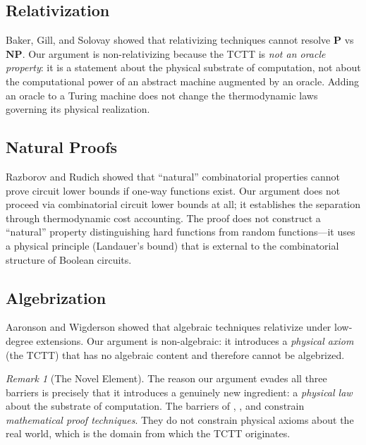 \documentclass[12pt, a4paper]{article}
\newcommand{\Pc}{\mathbf{P}}
\newcommand{\NPc}{\mathbf{NP}}
\theoremstyle{plain}
\theoremstyle{definition}
\theoremstyle{remark}
\newtheorem{remark}[theorem]{Remark}
\begin{document}
\subsection{Relativization}

Baker, Gill, and Solovay \citep{BakerGillSolovay1975} showed that
relativizing techniques cannot resolve $\Pc$ vs $\NPc$. Our argument is
non-relativizing because the TCTT is \emph{not an oracle property}: it
is a statement about the physical substrate of computation, not about
the computational power of an abstract machine augmented by an oracle.
Adding an oracle to a Turing machine does not change the thermodynamic
laws governing its physical realization.

\subsection{Natural Proofs}

Razborov and Rudich \citep{RazborovRudich1997} showed that ``natural''
combinatorial properties cannot prove circuit lower bounds if one-way
functions exist. Our argument does not proceed via combinatorial circuit
lower bounds at all; it establishes the separation through thermodynamic
cost accounting. The proof does not construct a ``natural'' property
distinguishing hard functions from random functions---it uses a physical
principle (Landauer's bound) that is external to the combinatorial structure
of Boolean circuits.

\subsection{Algebrization}

Aaronson and Wigderson \citep{AaronsonWigderson2009} showed that
algebraic techniques relativize under low-degree extensions. Our
argument is non-algebraic: it introduces a \emph{physical axiom}
(the TCTT) that has no algebraic content and therefore cannot be
algebrized.

\begin{remark}[The Novel Element]
  The reason our argument evades all three barriers is precisely
  that it introduces a genuinely new ingredient: a \emph{physical law}
  about the substrate of computation. The barriers of
  \citet{BakerGillSolovay1975}, \citet{RazborovRudich1997}, and
  \citet{AaronsonWigderson2009} constrain \emph{mathematical proof
  techniques}. They do not constrain physical axioms about the
  real world, which is the domain from which the TCTT originates.
\end{remark}
\end{document}
